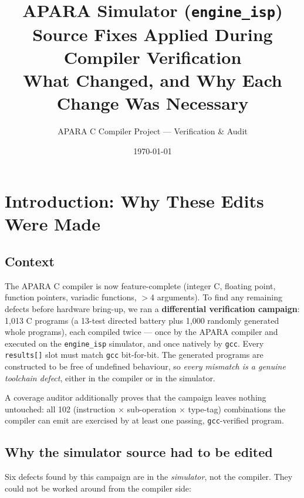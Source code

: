 \documentclass[11pt,a4paper]{report}
\title{\textbf{APARA Simulator (\texttt{engine\_isp}) \\ Source Fixes Applied During Compiler Verification \\ \large What Changed, and Why Each Change Was Necessary}}
\author{APARA C Compiler Project --- Verification \& Audit}
\date{\today}
\begin{document}
\maketitle
\tableofcontents

\chapter{Introduction: Why These Edits Were Made}

\section{Context}

The APARA C compiler is now feature-complete (integer C, floating point,
function pointers, variadic functions, $>$4 arguments). To find any remaining
defects before hardware bring-up, we ran a \textbf{differential verification
campaign}: 1{,}013 C programs (a 13-test directed battery plus 1{,}000
randomly generated whole programs), each compiled twice --- once by the APARA
compiler and executed on the \texttt{engine\_isp} simulator, and once natively
by \texttt{gcc}. Every \texttt{results[]} slot must match \texttt{gcc}
bit-for-bit. The generated programs are constructed to be free of undefined
behaviour, so \emph{every mismatch is a genuine toolchain defect}, either in
the compiler or in the simulator.

A coverage auditor additionally proves that the campaign leaves nothing
untouched: all 102 (instruction $\times$ sub-operation $\times$ type-tag)
combinations the compiler can emit are exercised by at least one passing,
\texttt{gcc}-verified program.

\section{Why the simulator source had to be edited}

Six defects found by this campaign are in the \emph{simulator}, not the
compiler. They could not be worked around from the compiler side:
\end{document}
